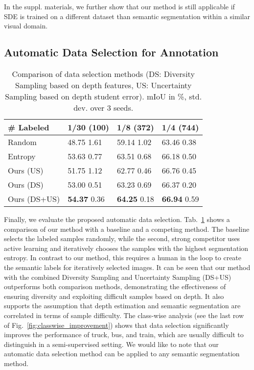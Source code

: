 \documentclass[final]{cvpr}
\begin{document}
In the suppl. materials, we further show that our method is still applicable if SDE is trained on a different dataset than semantic segmentation within a similar visual domain.

\subsection{Automatic Data Selection for Annotation}
\label{sec:results_label_selection}

\begin{table}
\caption{Comparison of data selection methods (DS: Diversity Sampling based on depth features, US: Uncertainty Sampling based on depth student error). mIoU in \%, std. dev. over 3 seeds.}
\label{tab:label_selection}
\vspace{0.2cm}
\centering
\begin{tabular}{llll}
\hline
\# Labeled          & 1/30 (100) & 1/8 (372) & 1/4 (744) \\
\hline\hline

Random & 48.75	\scriptsize{1.61} & 59.14 \scriptsize{1.02}	&	63.46	\scriptsize{0.38}\\
Entropy & 53.63	\scriptsize{0.77}	& 63.51	\scriptsize{0.68}	& 66.18	\scriptsize{0.50} \\
Ours (US) & 51.75	\scriptsize{1.12}	& 62.77	\scriptsize{0.46}	& 66.76	\scriptsize{0.45} \\
Ours (DS) & 53.00	\scriptsize{0.51}	& 63.23	\scriptsize{0.69}	& 66.37	\scriptsize{0.20} \\
Ours (DS+US) & \textbf{54.37}	\scriptsize{0.36} & \textbf{64.25}	\scriptsize{0.18}	& \textbf{66.94}	\scriptsize{0.59} \\
\hline
\end{tabular}
\end{table}

Finally, we evaluate the proposed automatic data selection. Tab.~\ref{tab:label_selection} shows a comparison of our method with a baseline and a competing method. The baseline selects the labeled samples randomly, while the second, strong competitor uses active learning and iteratively chooses the samples with the highest segmentation entropy. In contrast to our method, this requires a human in the loop to create the semantic labels for iteratively selected images. It can be seen that our method with the combined Diversity Sampling and Uncertainty Sampling (DS+US) outperforms both comparison methods, demonstrating the effectiveness of ensuring diversity and exploiting difficult samples based on depth. It also supports the assumption that depth estimation and semantic segmentation are correlated in terms of sample difficulty. The class-wise analysis (see the last row of Fig.~\ref{fig:classwise_improvement}) shows that data selection significantly improves the performance of truck, bus, and train, which are usually difficult to distinguish in a semi-supervised setting. We would like to note that our automatic data selection method can be applied to any semantic segmentation method. 
\end{document}
